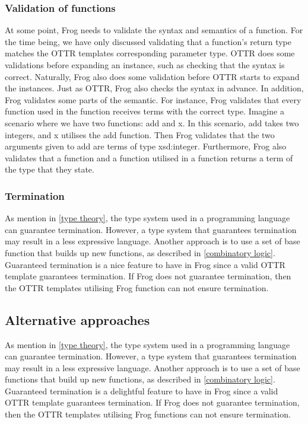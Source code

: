 \subsubsection{Validation of functions}
At some point, Frog needs to validate the syntax and semantics of a function. For the time being, we have only discussed validating that a function's return type matches the OTTR templates corresponding parameter type. OTTR does some validations before expanding an instance, such as checking that the syntax is correct. Naturally, Frog also does some validation before OTTR starts to expand the instances. Just as OTTR, Frog also checks the syntax in advance. In addition, Frog validates some parts of the semantic. For instance, Frog validates that every function used in the function receives terms with the correct type. Imagine a scenario where we have two functions: add and x. In this scenario, add takes two integers, and x utilises the add function. Then Frog validates that the two arguments given to add are terms of type xsd:integer. Furthermore, Frog also validates that a function and a function utilised in a function returns a term of the type that they state.

\subsubsection{Termination}
As mention in \autoref{type theory}, the type system used in a programming language can guarantee termination. However, a type system that guarantees termination may result in a less expressive language. Another approach is to use a set of base function that builds up new functions, as described in \autoref{combinatory logic}. Guaranteed termination is a nice feature to have in Frog since a valid OTTR template guarantees termination. If Frog does not guarantee termination, then the OTTR templates utilising Frog function can not ensure termination. 

\subsection{Alternative approaches}
As mention in \autoref{type theory}, the type system used in a programming language can guarantee termination. However, a type system that guarantees termination may result in a less expressive language. Another approach is to use a set of base functions that build up new functions, as described in \autoref{combinatory logic}. Guaranteed termination is a delightful feature to have in Frog since a valid OTTR template guarantees termination. If Frog does not guarantee termination, then the OTTR templates utilising Frog functions can not ensure termination.

